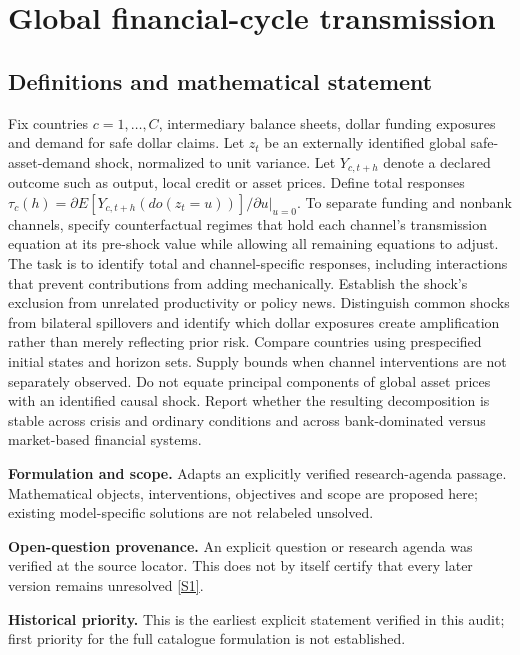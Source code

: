 \documentclass[11pt]{article}
\newcommand{\sref}[2]{\hyperlink{source:#1:#2}{[S#2]}}
\begin{document}
\section*{Global financial-cycle transmission}\label{30007615}
\subsection{Definitions and mathematical statement}
Fix countries \(c=1,\ldots,C\), intermediary balance sheets, dollar funding exposures and demand for safe dollar claims. Let \(z_t\) be an externally identified global safe-asset-demand shock, normalized to unit variance. Let \(Y_{c,t+h}\) denote a declared outcome such as output, local credit or asset prices. Define total responses \(\tau_c(h)=\partial E[Y_{c,t+h}(do(z_t=u))]/\partial u|_{u=0}\). To separate funding and nonbank channels, specify counterfactual regimes that hold each channel's transmission equation at its pre-shock value while allowing all remaining equations to adjust. The task is to identify total and channel-specific responses, including interactions that prevent contributions from adding mechanically. Establish the shock's exclusion from unrelated productivity or policy news. Distinguish common shocks from bilateral spillovers and identify which dollar exposures create amplification rather than merely reflecting prior risk. Compare countries using prespecified initial states and horizon sets. Supply bounds when channel interventions are not separately observed. Do not equate principal components of global asset prices with an identified causal shock. Report whether the resulting decomposition is stable across crisis and ordinary conditions and across bank-dominated versus market-based financial systems.

\par\textbf{Formulation and scope.} Adapts an explicitly verified research-agenda passage. Mathematical objects, interventions, objectives and scope are proposed here; existing model-specific solutions are not relabeled unsolved.

\par\textbf{Open-question provenance.} An explicit question or research agenda was verified at the source locator. This does not by itself certify that every later version remains unresolved \sref{30007615}{1}.

\par\textbf{Historical priority.} This is the earliest explicit statement verified in this audit; first priority for the full catalogue formulation is not established.
\end{document}
